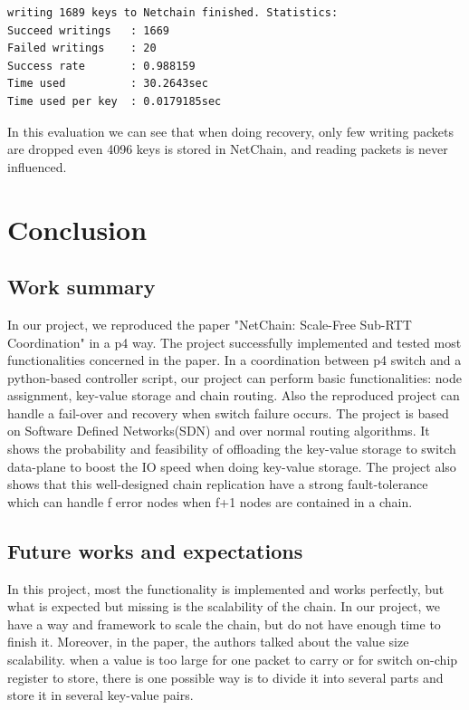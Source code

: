 \documentclass[11pt,oneside,a4paper]{article}
\begin{document}
\begin{enumerate}
\begin{lstlisting}
writing 1689 keys to Netchain finished. Statistics:
Succeed writings   : 1669
Failed writings    : 20
Success rate       : 0.988159
Time used          : 30.2643sec
Time used per key  : 0.0179185sec
    \end{lstlisting}
    
In this evaluation we can see that when doing recovery, only few writing packets are dropped even 4096 keys is stored in NetChain, and reading packets is never influenced.




\end{enumerate}

\section{Conclusion}
\subsection{Work summary}
In our project, we reproduced the paper "NetChain: Scale-Free Sub-RTT Coordination" in a p4 way. The project successfully implemented and tested most functionalities concerned in the paper. In a coordination between p4 switch and a python-based controller script, our project can perform basic functionalities:  node assignment, key-value storage and chain routing. Also the reproduced project can handle a fail-over and recovery when switch failure occurs. The project is based on Software Defined Networks(SDN) and over normal routing algorithms. It shows the probability and feasibility of offloading the key-value storage to switch data-plane to boost the IO speed when doing key-value storage. The project also shows that this well-designed chain replication have a strong fault-tolerance which can handle f error nodes when f+1 nodes are contained in a chain. 

\subsection{Future works and expectations}

In this project, most the functionality is implemented and works perfectly, but what is expected but missing is the scalability of the chain. In our project, we have a way and framework to scale the chain, but do not have enough time to finish it. Moreover, in the paper, the authors talked about the value size scalability. when a value is too large for one packet to carry or for switch on-chip register to store, there is one possible way is to divide it into several parts and store it in several key-value pairs. 
\end{document}
